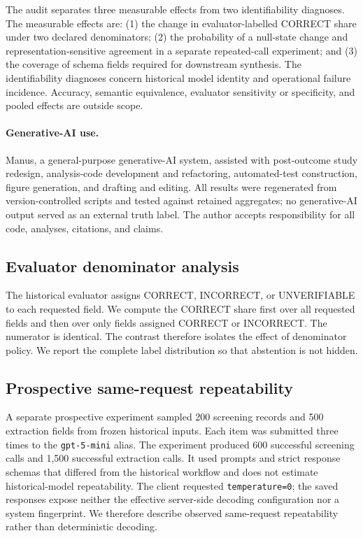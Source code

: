 \documentclass[acmsmall,anonymous,review]{acmart}
\begin{document}
The audit separates three measurable effects from two identifiability diagnoses. The measurable effects are: (1) the change in evaluator-labelled CORRECT share under two declared denominators; (2) the probability of a null-state change and representation-sensitive agreement in a separate repeated-call experiment; and (3) the coverage of schema fields required for downstream synthesis. The identifiability diagnoses concern historical model identity and operational failure incidence. Accuracy, semantic equivalence, evaluator sensitivity or specificity, and pooled effects are outside scope.

\paragraph{Generative-AI use.} Manus, a general-purpose generative-AI system, assisted with post-outcome study redesign, analysis-code development and refactoring, automated-test construction, figure generation, and drafting and editing. All results were regenerated from version-controlled scripts and tested against retained aggregates; no generative-AI output served as an external truth label. The author accepts responsibility for all code, analyses, citations, and claims.

\subsection{Evaluator denominator analysis}

The historical evaluator assigns CORRECT, INCORRECT, or UNVERIFIABLE to each requested field. We compute the CORRECT share first over all requested fields and then over only fields assigned CORRECT or INCORRECT. The numerator is identical. The contrast therefore isolates the effect of denominator policy. We report the complete label distribution so that abstention is not hidden.

\subsection{Prospective same-request repeatability}

A separate prospective experiment sampled 200 screening records and 500 extraction fields from frozen historical inputs. Each item was submitted three times to the \texttt{gpt-5-mini} alias. The experiment produced 600 successful screening calls and 1,500 successful extraction calls. It used prompts and strict response schemas that differed from the historical workflow and does not estimate historical-model repeatability. The client requested \texttt{temperature=0}; the saved responses expose neither the effective server-side decoding configuration nor a system fingerprint. We therefore describe observed same-request repeatability rather than deterministic decoding.
\end{document}
